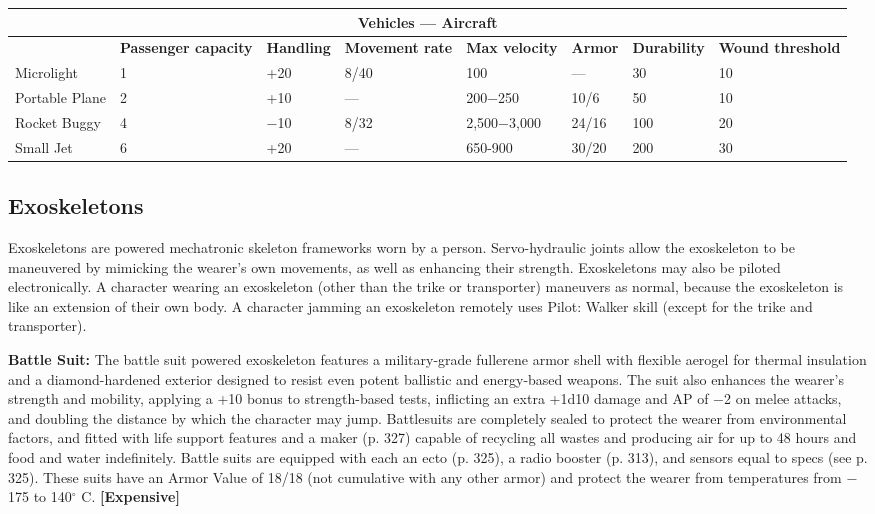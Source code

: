 \begin{table} \begin{tabularx}{\textwidth}{|X|X|X|X|X|l|l|X|} \hline

\multicolumn{8}{|c|}{\textbf{Vehicles --- Aircraft}} \\ \hline

&\textbf{Passenger capacity}	&\textbf{Handling}	&\textbf{Movement rate}	&\textbf{Max velocity}	&\textbf{Armor}	&\textbf{Durability}	&\textbf{Wound threshold} \\ \hline

Microlight	&1	&+20	&8/40	&100	&--- &30	&10 \\ \hline

Portable Plane	&2	&+10	&--- &200$-$250	&10/6	&50	&10 \\ \hline

Rocket Buggy	&4	&$-$10	&8/32	&2,500$-$3,000	&24/16	&100	&20 \\ \hline

Small Jet	&6	&+20	&--- &650-900	&30/20	&200	&30 \\ \hline

\end{tabularx} \label{tab:aircraft} \end{table} 



\subsection{Exoskeletons} \label{sec:exoskeletons} 

Exoskeletons are powered mechatronic skeleton frameworks worn by a person. Servo-hydraulic joints allow the exoskeleton to be maneuvered by mimicking the wearer’s own movements, as well as enhancing their strength. Exoskeletons may also be piloted electronically. A character wearing an exoskeleton (other than the trike or transporter) maneuvers as normal, because the exoskeleton is like an extension of their own body. A character jamming an exoskeleton remotely uses Pilot: Walker skill (except for the trike and transporter). 

\textbf{Battle Suit:} The battle suit powered exoskeleton features a military-grade fullerene armor shell with flexible aerogel for thermal insulation and a diamond-hardened exterior designed to resist even potent ballistic and energy-based weapons. The suit also enhances the wearer’s strength and mobility, applying a +10 bonus to strength-based tests, inflicting an extra +1d10 damage and AP of $-$2 on melee attacks, and doubling the distance by which the character may jump. Battlesuits are completely sealed to protect the wearer from environmental factors, and fitted with life support features and a maker (p. 327) capable of recycling all wastes and producing air for up to 48 hours and food and water indefinitely. Battle suits are equipped with each an ecto (p. 325), a radio booster (p. 313), and sensors equal to specs (see p. 325). These suits have an Armor Value of 18/18 (not cumulative with any other armor) and protect the wearer from temperatures from $-$175 to 140$^{\circ}$ C. \textbf{[Expensive]} 

